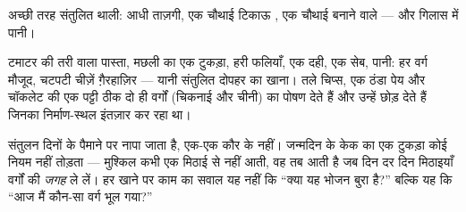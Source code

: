 \begin{omfigure}

{\small अच्छी तरह संतुलित थाली: आधी ताज़गी, एक चौथाई टिकाऊ , एक
चौथाई बनाने वाले --- और गिलास में पानी।}
\end{omfigure}

\begin{example}\label{ex:g3:balanced-diet:lunch}
टमाटर की तरी वाला पास्ता, मछली का एक टुकड़ा, हरी फलियाँ, एक दही, एक
सेब, पानी: हर वर्ग मौजूद, चटपटी चीज़ें ग़ैरहाज़िर --- यानी संतुलित
दोपहर का खाना। तले चिप्स, एक ठंडा पेय और चॉकलेट की एक पट्टी ठीक दो ही
वर्गों (चिकनाई और चीनी) का पोषण देते हैं और उन्हें छोड़ देते हैं
जिनका निर्माण-स्थल इंतज़ार कर रहा था।
\end{example}

\begin{remark}[कोई भोजन मना नहीं, बस भुलाया हुआ]\label{rem:g3:balanced-diet:balance}
संतुलन दिनों के पैमाने पर नापा जाता है, एक-एक कौर के नहीं। जन्मदिन के
केक का एक टुकड़ा कोई नियम नहीं तोड़ता --- मुश्किल कभी एक मिठाई से नहीं
आती, वह तब आती है जब दिन दर दिन मिठाइयाँ वर्गों की \emph{जगह} ले लें।
हर खाने पर काम का सवाल यह नहीं कि ``क्या यह भोजन बुरा है?'' बल्कि यह
कि ``आज मैं कौन-सा वर्ग भूल गया?''
\end{remark}

